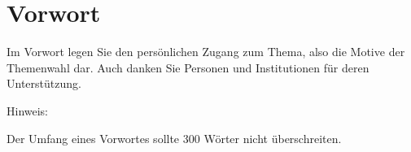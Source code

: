 \part{Vorwort}
Im Vorwort legen Sie den persönlichen Zugang zum Thema, also die Motive der Themenwahl dar. Auch danken Sie Personen und Institutionen für deren Unterstützung.

Hinweis:

Der Umfang eines Vorwortes sollte 300 Wörter nicht überschreiten.

